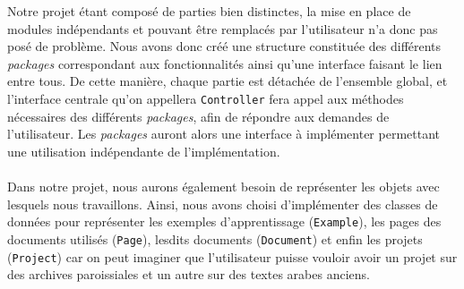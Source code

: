 Notre projet étant composé de parties bien distinctes, la mise en place de modules indépendants et pouvant être remplacés par l'utilisateur n'a donc pas posé de problème. Nous avons donc créé une structure constituée des différents \textit{packages} correspondant aux fonctionnalités ainsi qu'une interface faisant le lien entre tous. De cette manière, chaque partie est détachée de l'ensemble global, et l'interface centrale qu'on appellera \texttt{Controller} fera appel aux méthodes nécessaires des différents \textit{packages}, afin de répondre aux demandes de l'utilisateur. Les \textit{packages} auront alors une interface à implémenter permettant une utilisation indépendante de l'implémentation.
\newpage
{}

\paragraph{}
Dans notre projet, nous aurons également besoin de représenter les objets avec lesquels nous travaillons. Ainsi, nous avons choisi d'implémenter des classes de données pour représenter les exemples d'apprentissage (\texttt{Example}), les pages des documents utilisés (\texttt{Page}), lesdits documents (\texttt{Document}) et enfin les projets (\texttt{Project}) car on peut imaginer que l'utilisateur puisse vouloir avoir un projet sur des archives paroissiales et un autre sur des textes arabes anciens.

